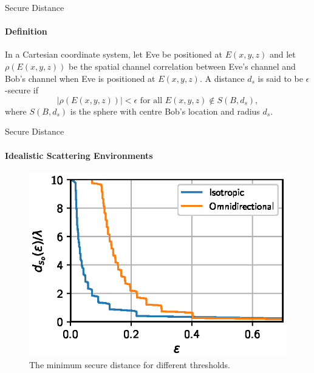 \begin{frame}{Secure Distance}
\framesubtitle{Definition}    

\begin{definition}
    In a Cartesian coordinate system, let Eve be positioned at $E(x,y,z)$ and let $\rho(E(x,y,z))$ be the spatial channel correlation between Eve's channel and Bob's channel when Eve is positioned at $E(x,y,z)$. A distance $d_{s}$ is said to be $\epsilon$-secure if
    ~
    \begin{equation}
        |\rho(E(x,y,z))| < \epsilon \text{ for all } E(x,y,z)\notin S(B,d_s),
    \label{secure distance}\end{equation}
    where $S(B,d_{s})$ is the sphere with centre Bob's location and radius $d_{s}$. \label{dfn: secure distance}
\end{definition}
\end{frame}


\begin{frame}{Secure Distance}
\framesubtitle{Idealistic Scattering Environments}
\begin{figure}
    \centering
   \includegraphics{figures/key_generation_and_spatial_seperation/securedistrichscattering.eps}
    \caption{The minimum secure distance for different thresholds.}
\end{figure} 
\end{frame}



